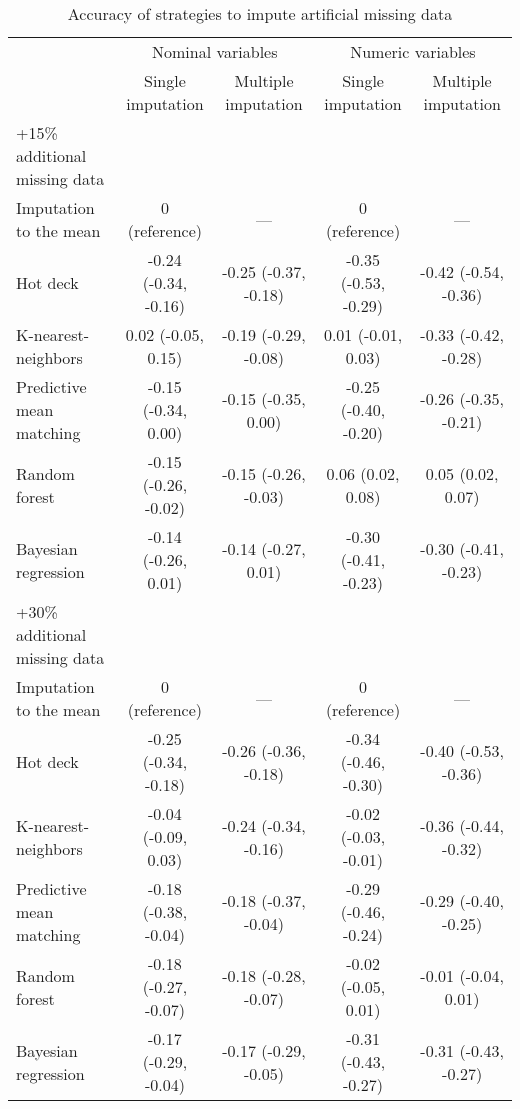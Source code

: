 \documentclass{article}
\begin{document}
\clearpage

\begin{table} 
 \caption{Accuracy of strategies to impute artificial missing data} 
\label{tbl_impute_accuracy} 
 
\begin{tabular}{lcccc}
\toprule
& \multicolumn{2}{c}{Nominal variables} & \multicolumn{2}{c}{Numeric variables} \\ 
 \cmidrule(lr){2-3}\cmidrule(lr){4-5}
 & Single imputation & Multiple imputation & Single imputation & Multiple imputation \\ 
\midrule
\multicolumn{1}{l}{+15\% additional missing data} \\ 
\midrule
Imputation to the mean & 0 (reference) & --- & 0 (reference) & --- \\ 
Hot deck & -0.24 (-0.34, -0.16) & -0.25 (-0.37, -0.18) & -0.35 (-0.53, -0.29) & -0.42 (-0.54, -0.36) \\ 
K-nearest-neighbors & 0.02 (-0.05, 0.15) & -0.19 (-0.29, -0.08) & 0.01 (-0.01, 0.03) & -0.33 (-0.42, -0.28) \\ 
Predictive mean matching & -0.15 (-0.34, 0.00) & -0.15 (-0.35, 0.00) & -0.25 (-0.40, -0.20) & -0.26 (-0.35, -0.21) \\ 
Random forest & -0.15 (-0.26, -0.02) & -0.15 (-0.26, -0.03) & 0.06 (0.02, 0.08) & 0.05 (0.02, 0.07) \\ 
Bayesian regression & -0.14 (-0.26, 0.01) & -0.14 (-0.27, 0.01) & -0.30 (-0.41, -0.23) & -0.30 (-0.41, -0.23) \\ 
\midrule
\multicolumn{1}{l}{+30\% additional missing data} \\ 
\midrule
Imputation to the mean & 0 (reference) & --- & 0 (reference) & --- \\ 
Hot deck & -0.25 (-0.34, -0.18) & -0.26 (-0.36, -0.18) & -0.34 (-0.46, -0.30) & -0.40 (-0.53, -0.36) \\ 
K-nearest-neighbors & -0.04 (-0.09, 0.03) & -0.24 (-0.34, -0.16) & -0.02 (-0.03, -0.01) & -0.36 (-0.44, -0.32) \\ 
Predictive mean matching & -0.18 (-0.38, -0.04) & -0.18 (-0.37, -0.04) & -0.29 (-0.46, -0.24) & -0.29 (-0.40, -0.25) \\ 
Random forest & -0.18 (-0.27, -0.07) & -0.18 (-0.28, -0.07) & -0.02 (-0.05, 0.01) & -0.01 (-0.04, 0.01) \\ 
Bayesian regression & -0.17 (-0.29, -0.04) & -0.17 (-0.29, -0.05) & -0.31 (-0.43, -0.27) & -0.31 (-0.43, -0.27) \\ 
\bottomrule
\end{tabular} 
 \end{table}



\end{document}
